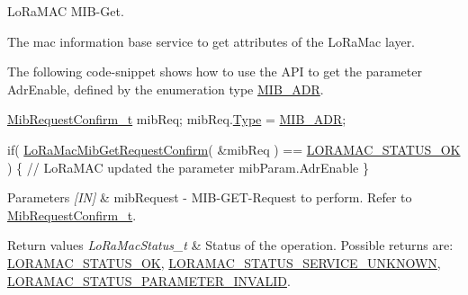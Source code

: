 Lo\+Ra\+M\+AC M\+I\+B-\/\+Get. 

The mac information base service to get attributes of the Lo\+Ra\+Mac layer.

The following code-\/snippet shows how to use the A\+PI to get the parameter Adr\+Enable, defined by the enumeration type \hyperlink{group__LORAMAC_gga32ea83d13a3f5bb4b3ec2ace2319ab61a756ff0b66217e3e4ddd0442c8aa56802}{M\+I\+B\+\_\+\+A\+DR}. 
\begin{DoxyCode}
\hyperlink{structeMibRequestConfirm}{MibRequestConfirm\_t} mibReq;
mibReq.\hyperlink{structeMibRequestConfirm_ad3d963c102bbd81f7dd9918f4c1731c1}{Type} = \hyperlink{group__LORAMAC_gga32ea83d13a3f5bb4b3ec2ace2319ab61a756ff0b66217e3e4ddd0442c8aa56802}{MIB\_ADR};

\textcolor{keywordflow}{if}( \hyperlink{group__LORAMAC_ga3e208a4f73213aa801eeb9d9da7b71dd}{LoRaMacMibGetRequestConfirm}( &mibReq ) == 
      \hyperlink{group__LORAMAC_gga1d18f26b344040b3ec5c3db662919661a03db5fca052313edb3823c014b653a74}{LORAMAC\_STATUS\_OK} )
\{
  \textcolor{comment}{// LoRaMAC updated the parameter mibParam.AdrEnable}
\}
\end{DoxyCode}



\begin{DoxyParams}{Parameters}
{\em \mbox{[}\+I\+N\mbox{]}} & mib\+Request -\/ M\+I\+B-\/\+G\+E\+T-\/\+Request to perform. Refer to \hyperlink{group__LORAMAC_ga9269d5ae88dd157a58e9d60f680d63f0}{Mib\+Request\+Confirm\+\_\+t}.\\
\hline
\end{DoxyParams}

\begin{DoxyRetVals}{Return values}
{\em Lo\+Ra\+Mac\+Status\+\_\+t} & Status of the operation. Possible returns are\+: \hyperlink{group__LORAMAC_gga1d18f26b344040b3ec5c3db662919661a03db5fca052313edb3823c014b653a74}{L\+O\+R\+A\+M\+A\+C\+\_\+\+S\+T\+A\+T\+U\+S\+\_\+\+OK}, \hyperlink{group__LORAMAC_gga1d18f26b344040b3ec5c3db662919661aff502a87db22d6a9a4919e4b54c7c1cf}{L\+O\+R\+A\+M\+A\+C\+\_\+\+S\+T\+A\+T\+U\+S\+\_\+\+S\+E\+R\+V\+I\+C\+E\+\_\+\+U\+N\+K\+N\+O\+WN}, \hyperlink{group__LORAMAC_gga1d18f26b344040b3ec5c3db662919661ad0d3119f247d00e1787dda106fcb3017}{L\+O\+R\+A\+M\+A\+C\+\_\+\+S\+T\+A\+T\+U\+S\+\_\+\+P\+A\+R\+A\+M\+E\+T\+E\+R\+\_\+\+I\+N\+V\+A\+L\+ID}. \\
\hline
\end{DoxyRetVals}
\mbox{\label{group__LORAMAC_ga7a4ee0ced221591206b09630d4a70844}} 
